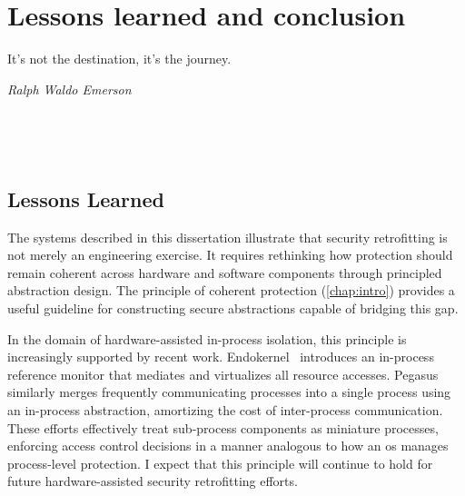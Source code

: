 %
\chapter{Lessons learned and conclusion}\label{chap:discussion}

\epigraph{It's not the destination, it's the journey.}{\emph{Ralph Waldo Emerson}}

\

\





\section{Lessons Learned}


The systems described in this dissertation illustrate that security retrofitting is not merely an engineering exercise.
It requires rethinking how protection should remain coherent across hardware and software components through principled abstraction design.
The principle of coherent protection (\cref{chap:intro}) provides a useful guideline for constructing secure abstractions capable of bridging this gap.

In the domain of hardware-assisted in-process isolation, this principle is increasingly supported by recent work.
Endokernel~\cite{yang2025endokernel} introduces an in-process reference monitor that mediates and virtualizes all resource accesses.
Pegasus~\cite{dinglan2025pegasus} similarly merges frequently communicating processes into a single process using an in-process abstraction, amortizing the cost of inter-process communication.
These efforts effectively treat sub-process components as miniature processes, enforcing access control decisions in a manner analogous to how an \gls{os} manages process-level protection.
I expect that this principle will continue to hold for future hardware-assisted security retrofitting efforts.



